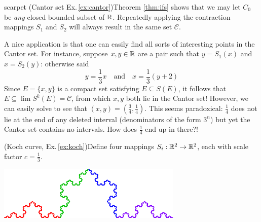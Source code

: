 \begin{examples}{}{scarpet}
\exstart (Cantor set Ex.\,\ref{ex:cantor})\lstsp Theorem \ref{thm:ifs} shows that we may let $C_0$ be \emph{any} closed bounded subset of $\mathbb{R}$. Repeatedly applying the contraction mappings $S_1$ and $S_2$ will always result in the same set $\mathcal C$.\vspace{-10pt}

\begin{enumerate}\setcounter{enumi}{1}
  \item[]A nice application is that one can easily find all sorts of interesting points in the Cantor set. For instance, suppose $x,y\in\mathbb{R}$ are a pair such that $y=S_1(x)$ and $x=S_2(y)$: otherwise said
\[y=\frac 13 x\quad\text{and}\quad x=\frac 13(y+2)\]
Since $E=\{x,y\}$ is a compact set satisfying $E\subseteq S(E)$, it follows that $E\subseteq\lim%
S^k(E)=\mathcal C$, from which $x,y$ both lie in the Cantor set! However, we can easily solve to see that $(x,y)=(\frac 34,\frac 14)$. This seems paradoxical: $\frac 14$ does not lie at the end of any deleted interval (denominators of the form $3^n$) but yet the Cantor set contains no intervals. How does $\frac 14$ end up in there?!

\begin{minipage}[t]{0.65\linewidth}\vspace{0pt}
	\item (Koch curve, Ex.\,\ref{ex:koch})\lstsp Define four mappings $S_i:\mathbb{R}^2\to\mathbb{R}^2$, each with scale factor $c=\frac 13$.
\end{minipage}\hfill\begin{minipage}[t]{0.34\linewidth}\vspace{0pt}
	\flushright \href{http://www.math.uci.edu/~ndonalds/math161/koch-anim2.html}{\includegraphics[scale=0.96]{koch3}}
\end{minipage}\par
\vspace{-15pt}


\end{enumerate}
\end{examples}
